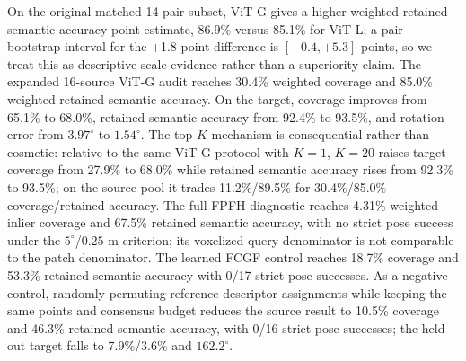 \documentclass[10pt,twocolumn]{article}
\begin{document}
\begin{table}[t]
\centering
\caption{Main results. Retained semantic accuracy is measured on accepted
inliers; FPFH is a non-equal-density diagnostic and FCGF is a geometry-only
control. A dash denotes that no single aggregate rotation/translation error
is meaningful for a multi-pair row.}
\label{tab:main}
\small
{}
\end{table}

On the original matched 14-pair subset, ViT-G gives a higher weighted retained
semantic accuracy point estimate, 86.9\% versus 85.1\% for ViT-L; a pair-bootstrap interval
for the +1.8-point difference is $[-0.4,+5.3]$ points, so we treat this as
descriptive scale evidence rather than a superiority claim. The expanded 16-source
ViT-G audit reaches 30.4\% weighted coverage and 85.0\% weighted retained
semantic accuracy.
On the target, coverage improves from 65.1\% to 68.0\%, retained semantic
accuracy from 92.4\% to 93.5\%, and rotation error from $3.97^\circ$ to
$1.54^\circ$.
The top-$K$ mechanism is consequential rather than cosmetic: relative to the
same ViT-G protocol with $K=1$, $K=20$ raises target coverage from 27.9\% to
68.0\% while retained semantic accuracy rises from 92.3\% to 93.5\%; on the source
pool it trades 11.2\%/89.5\% for 30.4\%/85.0\% coverage/retained accuracy.
The full FPFH diagnostic reaches 4.31\% weighted inlier coverage and 67.5\%
retained semantic accuracy, with no strict pose success under the
$5^\circ$/$0.25$ m criterion; its voxelized query denominator is not comparable
to the patch denominator. The learned FCGF control reaches 18.7\% coverage
and 53.3\% retained semantic accuracy with 0/17 strict pose successes.
As a negative control, randomly permuting reference descriptor assignments
while keeping the same points and consensus budget reduces the source result
to 10.5\% coverage and 46.3\% retained semantic accuracy, with 0/16 strict pose
successes; the held-out target falls to 7.9\%/3.6\% and $162.2^\circ$.
\end{document}
